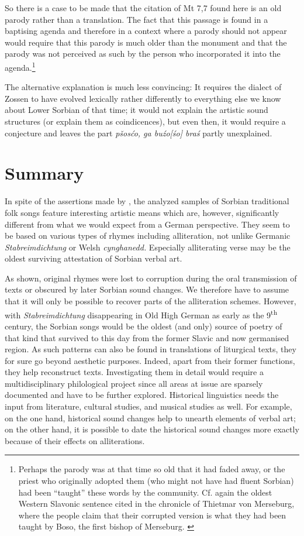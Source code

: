 \documentclass[output=paper,hidelinks]{langscibook}
\begin{document}
 
So there is a case to be made that the citation of Mt 7,7 found here is an old parody rather than a translation. The fact that this passage is found in a baptising agenda and therefore in a context where a parody should not appear would require that this parody is much older than the monument and that the parody was not perceived as such by the person who incorporated it into the agenda.\footnote{Perhaps the parody was at that time so old that it had faded away, or the priest who originally adopted them (who might not have had fluent Sorbian) had been “taught” these words by the community. Cf. again the oldest Western Slavonic sentence cited in the chronicle of Thietmar von Merseburg, where the people claim that their corrupted version is what they had been taught by Boso, the first bishop of Merseburg. \citep[27]{Stone2015}} 
 

 
The alternative explanation is much less convincing: It requires the dialect of Zossen to have evolved lexically rather differently to everything else we know about Lower Sorbian of that time; it would not explain the artistic sound structures (or explain them as coindicences), but even then, it would require a conjecture and leaves the part \textit{pšosćo, ga buźo[śo] braś} partly unexplained.
 

\section{Summary}
 
In spite of the assertions made by \citet{Nedo1966}, the analyzed samples of Sorbian traditional folk songs feature interesting artistic means which are, however, significantly different from what we would expect from a German perspective. They seem to be based on various types of rhymes including alliteration, not unlike Germanic \textit{Stabreimdichtung} or Welsh \textit{cynghanedd.} Especially alliterating verse may be the oldest surviving attestation of Sorbian verbal art.
 

 
As shown, original rhymes were lost to corruption during the oral transmission of texts or obscured by later Sorbian sound changes. We therefore have to assume that it will only be possible to recover parts of the alliteration schemes. However, with \textit{Stabreimdichtung} disappearing in Old High German as early as the 9\textsuperscript{th} century, the Sorbian songs would be the oldest (and only) source of poetry of that kind that survived to this day from the former Slavic and now germanised region. As such patterns can also be found in translations of liturgical texts, they for sure go beyond aesthetic purposes. Indeed, apart from their former functions, they help reconstruct texts. Investigating them in detail would require a multidisciplinary philological project since all areas at issue are sparsely documented and have to be further explored. Historical linguistics needs the input from literature, cultural studies, and musical studies as well. For example, on the one hand, historical sound changes help to unearth elements of verbal art; on the other hand, it is possible to date the historical sound changes more exactly because of their effects on alliterations.
 
\end{document}
